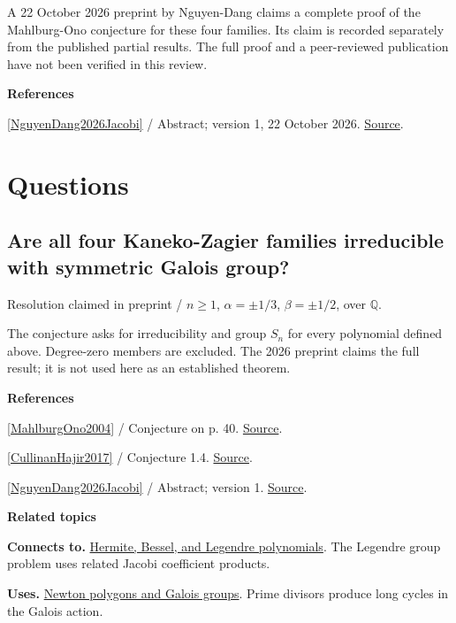\documentclass[11pt,a4paper,oneside,openany]{book}
\newenvironment{sources}{\par\smallskip\begingroup\footnotesize\color{atlasgray}\leftskip=10pt\setlength{\parskip}{2pt}}{\par\endgroup\smallskip}
\begin{document}
\color{black} A 22 October 2026 preprint by Nguyen-Dang claims a complete proof of the Mahlburg-Ono conjecture for these four families. Its claim is recorded separately from the published partial results. The full proof and a peer-reviewed publication have not been verified in this review.\par
\begin{sources}
\textbf{References}\par\smallskip
\noindent\hyperlink{ref:NguyenDang2026Jacobi}{[NguyenDang2026Jacobi]} / Abstract; version 1, 22 October 2026.  \href{https://hexagonmath.org/2610.00468v1}{Source}.\par
\end{sources}\color{black}
\section*{Questions}
\subsection*{Are all four Kaneko-Zagier families irreducible with symmetric Galois group?}
{\small\sffamily\color{atlasgold}Resolution claimed in preprint / \(n\ge1\), \(\alpha=\pm1/3\), \(\beta=\pm1/2\), over \(\mathbb Q\).}\par\smallskip
\color{black} The conjecture asks for irreducibility and group \(S_n\) for every polynomial defined above. Degree-zero members are excluded. The 2026 preprint claims the full result; it is not used here as an established theorem.\par
\begin{sources}
\textbf{References}\par\smallskip
\noindent\hyperlink{ref:MahlburgOno2004}{[MahlburgOno2004]} / Conjecture on p. 40.  \href{https://doi.org/10.4064/aa113-1-4}{Source}.\par
\noindent\hyperlink{ref:CullinanHajir2017}{[CullinanHajir2017]} / Conjecture 1.4.  \href{https://doi.org/10.1090/proc/13212}{Source}.\par
\noindent\hyperlink{ref:NguyenDang2026Jacobi}{[NguyenDang2026Jacobi]} / Abstract; version 1.  \href{https://hexagonmath.org/2610.00468v1}{Source}.\par
\end{sources}\color{black}
\par\medskip\begingroup\footnotesize\setlength{\parskip}{1pt}\textbf{\sffamily\color{atlasgreen}Related topics}\par
\color{black}\textbf{Connects to.} \hyperlink{article:orthogonal-families}{Hermite, Bessel, and Legendre polynomials}. The Legendre group problem uses related Jacobi coefficient products.\par
\color{black}\textbf{Uses.} \hyperlink{article:newton-polygons}{Newton polygons and Galois groups}. Prime divisors produce long cycles in the Galois action.\par
\endgroup
\end{document}
